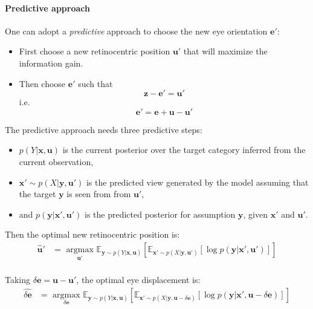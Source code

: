 \paragraph{Predictive approach}
One can adopt a \emph{predictive} approach to choose the new eye orientation $\boldsymbol{e}'$:
\begin{itemize}
	\item First choose a new retinocentric position $\boldsymbol{u}'$ that will maximize the  information gain.
	\item Then choose $\boldsymbol{e}'$ such that $$\boldsymbol{z} - \boldsymbol{e}' = \boldsymbol{u}'$$ i.e. $$\boldsymbol{e}' = \boldsymbol{e} + \boldsymbol{u} - \boldsymbol{u}'$$
\end{itemize}

The predictive approach needs three predictive steps:
\begin{itemize}
	\item $p(Y|\boldsymbol{x}, \boldsymbol{u})$ is the current posterior over the target category inferred from the current observation,
	\item $\boldsymbol{x}'\sim p(X|\boldsymbol{y},\boldsymbol{u}')$ is the predicted view generated by the model assuming that the target $\boldsymbol{y}$ is seen from from $\boldsymbol{u}'$,
	\item and $p(\boldsymbol{y}|\boldsymbol{x}', \boldsymbol{u}')$ is the predicted posterior for   assumption $\boldsymbol{y}$, given $\boldsymbol{x}'$ and $\boldsymbol{u}'$.
\end{itemize}

Then the optimal new retinocentric position is:
\begin{align*}
\hat{\boldsymbol{u}}' &= \underset{\boldsymbol{u}' }{\text{ argmax }}
 \mathbb{E}_{\boldsymbol{y}\sim p(Y|\boldsymbol{x}, \boldsymbol{u})}
 \left[\mathbb{E}_{ \boldsymbol{x}' \sim p(X|\boldsymbol{y}, \boldsymbol{u}')}
 \left[\log p(\boldsymbol{y}|\boldsymbol{x}', \boldsymbol{u}')\right]\right]\\
\end{align*}

Taking $\delta \boldsymbol{e} = \boldsymbol{u} - \boldsymbol{u}'$, the optimal eye displacement is:
\begin{align*}
\widehat{\delta\boldsymbol{e}} &= \underset{\delta\boldsymbol{e} }{\text{ argmax }}
\mathbb{E}_{\boldsymbol{y}\sim p(Y|\boldsymbol{x}, \boldsymbol{u})}
\left[\mathbb{E}_{ \boldsymbol{x}' \sim p(X|\boldsymbol{y}, \boldsymbol{u}- \delta \boldsymbol{e})}
\left[\log p(\boldsymbol{y}|\boldsymbol{x}', \boldsymbol{u}-\delta\boldsymbol{e})\right]\right]\\
\end{align*}

